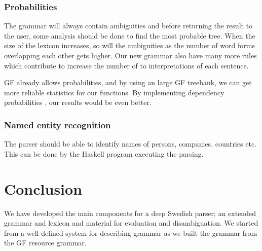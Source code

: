 \documentclass{report}
\begin{document}

\subsubsection{Probabilities}
\label{sec:futureProbabilities}
The grammar will always contain ambiguities and before returning the result
to the user, some analysis should be done to find the most probable tree.
When the size of the lexicon
increases, so will the ambiguities as the number of word forms overlapping each other
gets higher. Our new grammar also have many more rules which contribute
to increase the number of to interpretations of each sentence.

GF already allows probabilities, and by using an large
GF treebank, we can get more reliable statistics for our functions. 
By implementing dependency probabilities \cite{}, our results would be even better.

\subsubsection{Named entity recognition}
The parser should be able to identify names of persons, companies, countries etc.
This can be done by the Haskell program executing the parsing.






\section{Conclusion}


We have developed the main components
for a deep Swedish parser; an extended grammar and lexicon and material for
evaluation and disambiguation. %
We started from a well-defined system for describing grammar as we built
the grammar from the GF resource grammar.
\end{document}
